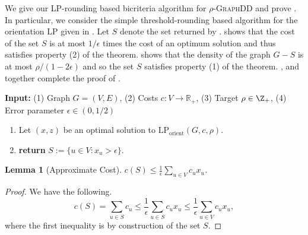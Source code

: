 \documentclass{article}
\newtheorem{lemma}{Lemma}[section]
\newcommand{\densitydeletionset}{\textsc{GraphDD}\xspace}
\newcommand{\rhodensitydeletionset}{\ensuremath{\rho\text{-}}\densitydeletionset\xspace}
\begin{document}
We give our LP-rounding based bicriteria algorithm for \rhodensitydeletionset and prove . In particular, we consider the simple threshold-rounding based algorithm for the orientation LP given in . Let $S$ denote the set returned by .  shows that the cost of the set $S$ is at most $1/\epsilon$ times the cost of an optimum solution and thus satisfies property (2) of the theorem.  shows that the density of the graph $G - S$ is at most $\rho/(1-2\epsilon)$ and so the set $S$ satisfies property (1) of the theorem. ,  and  together complete the proof of .

\begin{algorithm}
\caption{Bicriteria approximation algorithm for \densitydeletionset}\label{alg:bicriteria}
\textbf{Input:} (1) Graph $G=(V, E)$, (2) Costs $c:V\rightarrow\mathbb{R_{+}}$, (3) Target $\rho \in \Z_+$, (4) Error parameter $\epsilon \in (0, 1/2)$

\begin{enumerate}
    \item Let $(x, z)$ be an optimal solution to $\text{LP}_{\text{orient}}(G, c, \rho)$. 
    \item \textbf{return} $S := \{u \in V : x_u > \epsilon\}$.
\end{enumerate}
\end{algorithm}

\begin{lemma}[Approximate Cost] \label{lem:bicriteria-LP-rounding:cost}
$c(S) \leq \frac{1}{\epsilon}\sum_{u \in V}c_ux_u$.
\end{lemma}
\begin{proof} We have the following.
    $$c(S) = \sum_{u \in S}c_u \leq \frac{1}{\epsilon}\sum_{u \in S}c_ux_u \leq \frac{1}{\epsilon}\sum_{u \in V}c_ux_u,$$
    where the first inequality is by construction of the set $S$.
\end{proof}
\end{document}
